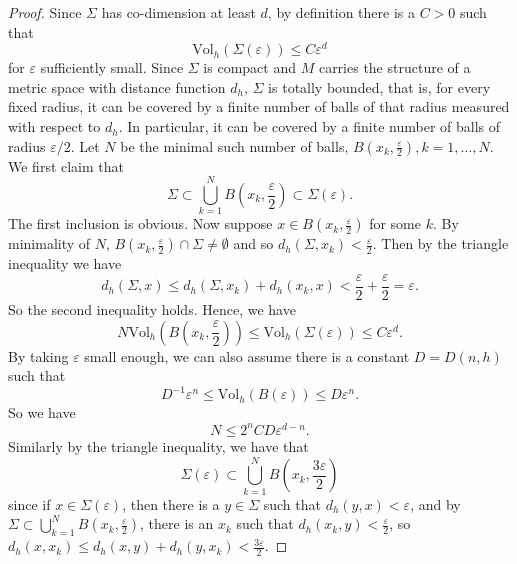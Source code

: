 \documentclass[12pt]{amsart}
\theoremstyle{plain}
\theoremstyle{plain}
\theoremstyle{definition}
\theoremstyle{remark}
\numberwithin{equation}{subsection}
\begin{document}
\begin{proof}
    Since $\Sigma$ has co-dimension at least $d$, by definition there is a $C > 0$ such that
    \begin{equation*}
        \text{Vol}_h(\Sigma(\varepsilon)) \leq C\varepsilon^d
    \end{equation*}
    for $\varepsilon$ sufficiently small. Since $\Sigma$ is compact and $M$ carries the structure of a metric space with distance function $d_h$, $\Sigma$ is totally bounded, that is, for every fixed radius, it can be covered by a finite number of balls of that radius measured with respect to $d_h$. In particular, it can be covered by a finite number of balls of radius $\varepsilon/2$. Let $N$ be the minimal such number of balls, $B(x_k, \frac{\varepsilon}{2}), k = 1,\dots,N$. We first claim that
    \begin{equation*}
        \Sigma \subset \bigcup\limits_{k=1}^N B\left(x_k,\frac{\varepsilon}{2}\right) \subset \Sigma(\varepsilon).
    \end{equation*}
    The first inclusion is obvious. Now suppose $x \in B(x_k,\frac{\varepsilon}{2})$ for some $k$. By minimality of $N$, $B(x_k,\frac{\varepsilon}{2})\cap\Sigma \neq \emptyset$ and so $d_h(\Sigma,x_k) < \frac{\varepsilon}{2}$. Then by the triangle inequality we have
    \begin{equation*}
        d_h(\Sigma, x) \leq d_h(\Sigma, x_k) + d_h(x_k, x) < \frac{\varepsilon}{2} + \frac{\varepsilon}{2} = \varepsilon.
    \end{equation*}
    So the second inequality holds. Hence, we have
    \begin{equation*}
        N\text{Vol}_h\left(B\left(x_k,\frac{\varepsilon}{2}\right)\right) \leq \text{Vol}_h(\Sigma(\varepsilon)) \leq C\varepsilon^d.
    \end{equation*}
    By taking $\varepsilon$ small enough, we can also assume there is a constant $D=D(n,h)$ such that
    \begin{equation*}
        D^{-1}\varepsilon^n \leq \text{Vol}_h(B(\varepsilon)) \leq D\varepsilon^n.
    \end{equation*}
    So we have
    \begin{equation}\label{eqn:distributional-scalar-curvature-N-estimate}
        N \leq 2^nCD\varepsilon^{d-n}.
    \end{equation}
    Similarly by the triangle inequality, we have that
    \begin{equation*}
        \Sigma(\varepsilon) \subset \bigcup\limits_{k=1}^N B\left(x_k,\frac{3\varepsilon}{2}\right)
    \end{equation*}
    since if $x \in \Sigma(\varepsilon)$, then there is a $y \in \Sigma$ such that $d_h(y,x) < \varepsilon$, and by $\Sigma \subset \bigcup\limits_{k=1}^N B\left(x_k,\frac{\varepsilon}{2}\right)$, there is an $x_k$ such that $d_h(x_k, y) < \frac{\varepsilon}{2}$, so $d_h(x,x_k) \leq d_h(x,y) + d_h(y,x_k) < \frac{3\varepsilon}{2}$.


\end{proof}
\end{document}
